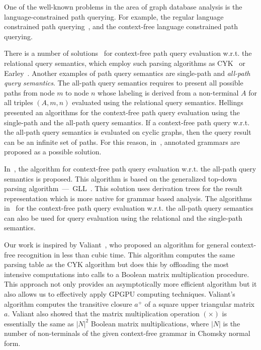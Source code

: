 \documentclass[runningheads,a4paper]{llncs}
\begin{document}
One of the well-known problems in the area of graph database analysis is the language-constrained path querying. For example, the regular language constrained path querying~\cite{reutter2017regular,fan2011adding,abiteboul1997regular,nole2016regular}, and the context-free language constrained path querying.

There is a number of solutions~\cite{hellingsRelational,GraphQueryWithEarley,RDF} for context-free path query evaluation w.r.t. the relational query semantics, which employ such parsing algorithms as CYK~\cite{kasami,younger} or Earley~\cite{Grune}. Another examples of path query semantics are single-path and \textit{all-path query semantics}. The all-path query semantics requires to present all possible paths from node $m$ to node $n$ whose labeling is derived from a non-terminal $A$ for all triples $(A, m, n)$ evaluated using the relational query semantics. Hellings~\cite{hellingsPathQuerying} presented an algorithms for the context-free path query evaluation using the single-path and the all-path query semantics. If a context-free path query w.r.t. the all-path query semantics is evaluated on cyclic graphs, then the query result can be an infinite set of paths. For this reason, in~\cite{hellingsPathQuerying}, annotated grammars are proposed as a possible solution.

In~\cite{GLL}, the algorithm for context-free path query evaluation w.r.t. the all-path query semantics is proposed. This algorithm is based on the generalized top-down parsing algorithm~---~GLL~\cite{scott2010gll}. This solution uses derivation trees for the result representation which is more native for grammar based analysis. The algorithms in~\cite{GLL,hellingsPathQuerying} for the context-free path query evaluation w.r.t. the all-path query semantics can also be used for query evaluation using the relational and the single-path semantics.

Our work is inspired by Valiant~\cite{valiant}, who proposed an algorithm for general context-free recognition in less than cubic time. This algorithm computes the same parsing table as the CYK algorithm but does this by offloading the most intensive computations into calls to a Boolean matrix multiplication procedure. This approach not only provides an asymptotically more efficient algorithm but it also allows us to effectively apply GPGPU computing techniques. Valiant's algorithm computes the transitive closure $a^+$ of a square upper triangular matrix $a$. Valiant also showed that the matrix multiplication operation $(\times)$ is essentially the same as $|N|^2$ Boolean matrix multiplications, where $|N|$ is the number of non-terminals of the given context-free grammar in Chomsky normal form.
\end{document}
